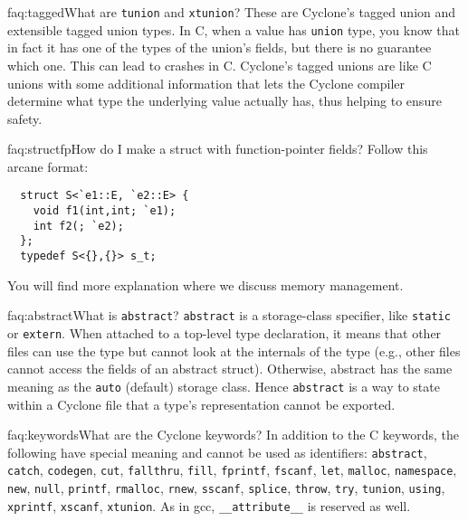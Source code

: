 \begin{faqa}{faq:tagged}{What are \texttt{tunion} and \texttt{xtunion}?}
These are Cyclone's tagged union and extensible tagged union types.
In C, when a value has \texttt{union} type, you know that in fact it
has one of the types of the union's fields, but there is no guarantee
which one.  This can lead to crashes in C\@.  Cyclone's tagged unions
are like C unions with some additional information that lets the
Cyclone compiler determine what type the underlying value actually
has, thus helping to ensure safety.
\end{faqa}

\begin{faqa}{faq:structfp}{How do I make a struct with function-pointer fields?}
Follow this arcane format:
\begin{verbatim}
  struct S<`e1::E, `e2::E> {
    void f1(int,int; `e1);
    int f2(; `e2);
  };
  typedef S<{},{}> s_t;
\end{verbatim}
You will find more explanation where we discuss memory management.
\end{faqa}

\begin{faqa}{faq:abstract}{What is \texttt{abstract}?}
\texttt{abstract} is a storage-class specifier, like \texttt{static}
or \texttt{extern}.  When attached to a top-level type declaration, it
means that other files can use the type but cannot look at the
internals of the type (e.g., other files cannot access the fields of
an abstract struct).  Otherwise, abstract has the same meaning as the
\texttt{auto} (default) storage class.  Hence \texttt{abstract} is a
way to state within a Cyclone file that a type's representation cannot
be exported.
\end{faqa}

\begin{faqa}{faq:keywords}{What are the Cyclone keywords?}
In addition to the C keywords, the following have special meaning and
cannot be used as identifiers: \texttt{abstract}, \texttt{catch},
\texttt{codegen}, \texttt{cut}, \texttt{fallthru}, \texttt{fill},
\texttt{fprintf}, \texttt{fscanf}, \texttt{let}, \texttt{malloc},
\texttt{namespace}, \texttt{new}, \texttt{null}, \texttt{printf},
\texttt{rmalloc}, \texttt{rnew}, \texttt{sscanf}, \texttt{splice},
\texttt{throw}, \texttt{try}, \texttt{tunion}, \texttt{using},
\texttt{xprintf}, \texttt{xscanf}, \texttt{xtunion}.  As in gcc,
\texttt{__attribute__} is reserved as well.
\end{faqa}


